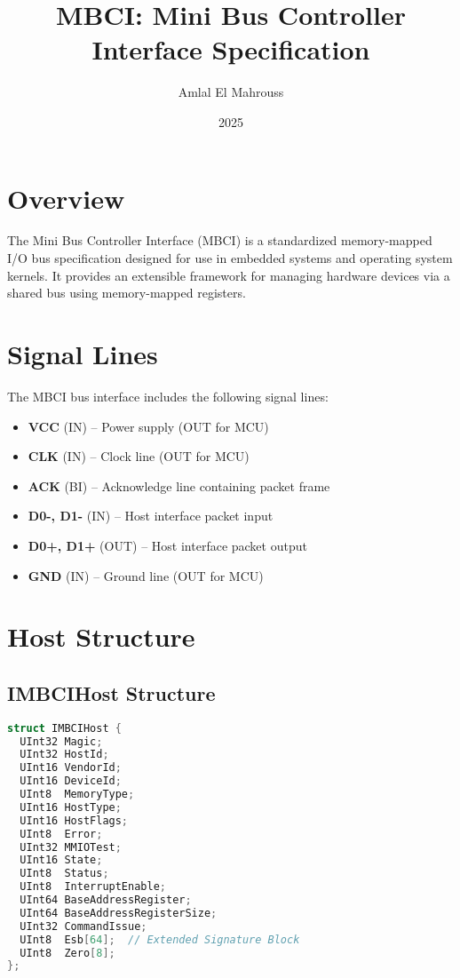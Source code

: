 \documentclass{article}
\title{MBCI: Mini Bus Controller Interface Specification}
\author{Amlal El Mahrouss}
\date{2025}
\begin{document}
\maketitle

\section{Overview}
The Mini Bus Controller Interface (MBCI) is a standardized memory-mapped I/O bus specification designed for use in embedded systems and operating system kernels. It provides an extensible framework for managing hardware devices via a shared bus using memory-mapped registers.

\section{Signal Lines}
The MBCI bus interface includes the following signal lines:

\begin{itemize}
  \item \textbf{VCC} (IN) – Power supply (OUT for MCU)
  \item \textbf{CLK} (IN) – Clock line (OUT for MCU)
  \item \textbf{ACK} (BI) – Acknowledge line containing packet frame
  \item \textbf{D0-, D1-} (IN) – Host interface packet input
  \item \textbf{D0+, D1+} (OUT) – Host interface packet output
  \item \textbf{GND} (IN) – Ground line (OUT for MCU)
\end{itemize}

\section{Host Structure}

\subsection*{IMBCIHost Structure}

\begin{lstlisting}[language=C++,basicstyle=\ttfamily\footnotesize]
struct IMBCIHost {
  UInt32 Magic;
  UInt32 HostId;
  UInt16 VendorId;
  UInt16 DeviceId;
  UInt8  MemoryType;
  UInt16 HostType;
  UInt16 HostFlags;
  UInt8  Error;
  UInt32 MMIOTest;
  UInt16 State;
  UInt8  Status;
  UInt8  InterruptEnable;
  UInt64 BaseAddressRegister;
  UInt64 BaseAddressRegisterSize;
  UInt32 CommandIssue;
  UInt8  Esb[64];  // Extended Signature Block
  UInt8  Zero[8];
};
\end{lstlisting}
\end{document}
